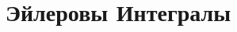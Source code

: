\documentclass[../main.tex]{subfiles}
\begin{document}
 \chapter{Эйлеровы Интегралы}
 
\end{document}
